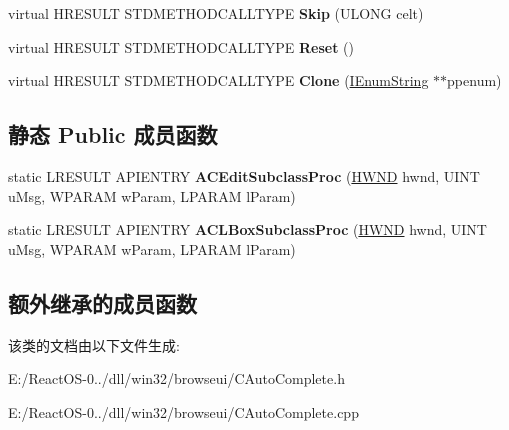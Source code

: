 \begin{DoxyCompactItemize}
\item 
\mbox{\label{class_c_auto_complete_adb508259d83b3de8466f3eb0b0927d78}} 
virtual H\+R\+E\+S\+U\+LT S\+T\+D\+M\+E\+T\+H\+O\+D\+C\+A\+L\+L\+T\+Y\+PE {\bfseries Skip} (U\+L\+O\+NG celt)
\item 
\mbox{\label{class_c_auto_complete_aa7482ea22e4161d76a080a4d49e39c2d}} 
virtual H\+R\+E\+S\+U\+LT S\+T\+D\+M\+E\+T\+H\+O\+D\+C\+A\+L\+L\+T\+Y\+PE {\bfseries Reset} ()
\item 
\mbox{\label{class_c_auto_complete_a2b91765278f4632448c984cd39aa254b}} 
virtual H\+R\+E\+S\+U\+LT S\+T\+D\+M\+E\+T\+H\+O\+D\+C\+A\+L\+L\+T\+Y\+PE {\bfseries Clone} (\hyperlink{interface_i_enum_string}{I\+Enum\+String} $\ast$$\ast$ppenum)
\end{DoxyCompactItemize}
\subsection*{静态 Public 成员函数}
\begin{DoxyCompactItemize}
\item 
\mbox{\label{class_c_auto_complete_a40782bc9fbb7726062c2050e0526772f}} 
static L\+R\+E\+S\+U\+LT A\+P\+I\+E\+N\+T\+RY {\bfseries A\+C\+Edit\+Subclass\+Proc} (\hyperlink{interfacevoid}{H\+W\+ND} hwnd, U\+I\+NT u\+Msg, W\+P\+A\+R\+AM w\+Param, L\+P\+A\+R\+AM l\+Param)
\item 
\mbox{\label{class_c_auto_complete_a1949e25779c8c6fa2660fa2c287ff6a3}} 
static L\+R\+E\+S\+U\+LT A\+P\+I\+E\+N\+T\+RY {\bfseries A\+C\+L\+Box\+Subclass\+Proc} (\hyperlink{interfacevoid}{H\+W\+ND} hwnd, U\+I\+NT u\+Msg, W\+P\+A\+R\+AM w\+Param, L\+P\+A\+R\+AM l\+Param)
\end{DoxyCompactItemize}
\subsection*{额外继承的成员函数}


该类的文档由以下文件生成\+:\begin{DoxyCompactItemize}
\item 
E\+:/\+React\+O\+S-\/0../dll/win32/browseui/C\+Auto\+Complete.\+h\item 
E\+:/\+React\+O\+S-\/0../dll/win32/browseui/C\+Auto\+Complete.\+cpp\end{DoxyCompactItemize}
